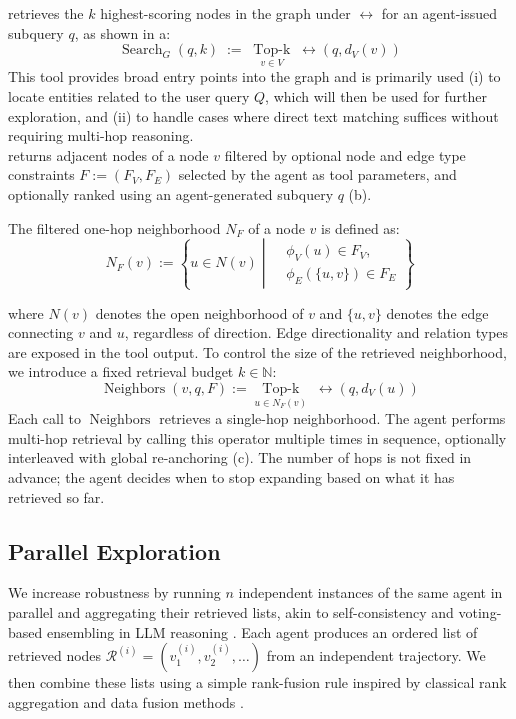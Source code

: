  retrieves the $k$ highest-scoring nodes in the graph under $\rel$ for an agent-issued subquery $q$, as shown in a:
\begin{equation*}
    \operatorname{Search}_G(q,k)
    \;:=\;
    \operatorname*{Top\text{-}k}_{v \in V}\; \rel(q, d_V(v))
\end{equation*}
This tool provides broad entry points into the graph and is primarily used (i) to locate entities related to the user query $Q$, which will then be used for further exploration, and (ii) to handle cases where direct text matching suffices without requiring multi-hop reasoning. \\

 returns adjacent nodes of a node $v$ filtered by optional node and edge type constraints $F := (F_V, F_E)$ selected by the agent as tool parameters, and optionally ranked using an agent-generated subquery $q$ (b).

The filtered one-hop neighborhood $N_F$ of a node $v$ is defined as:
\begin{equation*}
    N_F(v)
    :=
    \left\{
    u \in N(v)
    \;\left|\;
    \begin{aligned}
    & \phi_V(u) \in F_V, \\
    & \phi_E(\{u, v\}) \in F_E
    \end{aligned}
    \right.
    \right\}
\end{equation*}

where $N(v)$ denotes the open neighborhood of $v$ and $\{u, v\}$ denotes the edge connecting $v$ and $u$, regardless of direction. Edge directionality and relation types are exposed in the tool output. To control the size of the retrieved neighborhood, we introduce a fixed retrieval budget $k \in \mathbb{N}$:
%
\begin{equation*}
    \operatorname{Neighbors}(v, q, F)
    := \operatorname*{Top\text{-}k}_{u \in N_F(v)} \; \rel(q, d_V(u))
\end{equation*}
%
Each call to $\operatorname{Neighbors}$ retrieves a single-hop neighborhood. The agent performs multi-hop retrieval by calling this operator multiple times in sequence, optionally interleaved with global re-anchoring (c). The number of hops is not fixed in advance; the agent decides when to stop expanding based on what it has retrieved so far.

\subsection{Parallel Exploration}
\label{sec:parallel_exploration}
We increase robustness by running $n$ independent instances of the same agent in parallel and aggregating their retrieved lists, akin to self-consistency and voting-based ensembling in LLM reasoning \cite{wang_self-consistency_2023,kaesberg_voting_2025}. Each agent produces an ordered list of retrieved nodes $\mathcal{R}^{(i)}=(v^{(i)}_1,v^{(i)}_2,\dots)$ from an independent trajectory. We then combine these lists using a simple rank-fusion rule inspired by classical rank aggregation and data fusion methods \cite{fagin_efficient_2003,cormack_reciprocal_2009}.

